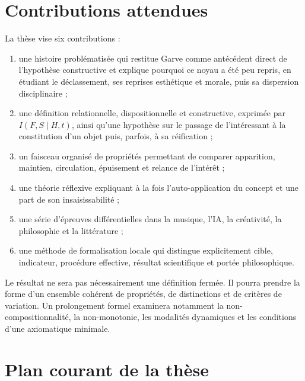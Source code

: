 \documentclass[11pt,a4paper]{article}
\begin{document}
\section{Contributions attendues}

La thèse vise six contributions :

\begin{enumerate}
  \item une histoire problématisée qui restitue Garve comme antécédent direct de
        l'hypothèse constructive et explique pourquoi ce noyau a été peu repris,
        en étudiant le déclassement, ses reprises esthétique et morale, puis sa dispersion
        disciplinaire ;
  \item une définition relationnelle, dispositionnelle et constructive,
        exprimée par \(I(F,S\mid H,t)\), ainsi qu'une hypothèse sur le passage
        de l'intéressant à la constitution d'un objet puis, parfois, à sa
        réification ;
  \item un faisceau organisé de propriétés permettant de comparer apparition,
        maintien, circulation, épuisement et relance de l'intérêt ;
  \item une théorie réflexive expliquant à la fois l'auto-application du concept
        et une part de son insaisissabilité ;
  \item une série d'épreuves différentielles dans la musique, l'IA, la
        créativité, la philosophie et la littérature ;
  \item une méthode de formalisation locale qui distingue explicitement cible,
        indicateur, procédure effective, résultat scientifique et portée
        philosophique.
\end{enumerate}

Le résultat ne sera pas nécessairement une définition fermée. Il pourra prendre
la forme d'un ensemble cohérent de propriétés, de distinctions et de critères de
variation. Un prolongement formel examinera notamment la
non-compositionnalité, la non-monotonie, les modalités dynamiques et les
conditions d'une axiomatique minimale.

\section{Plan courant de la thèse}
\end{document}
